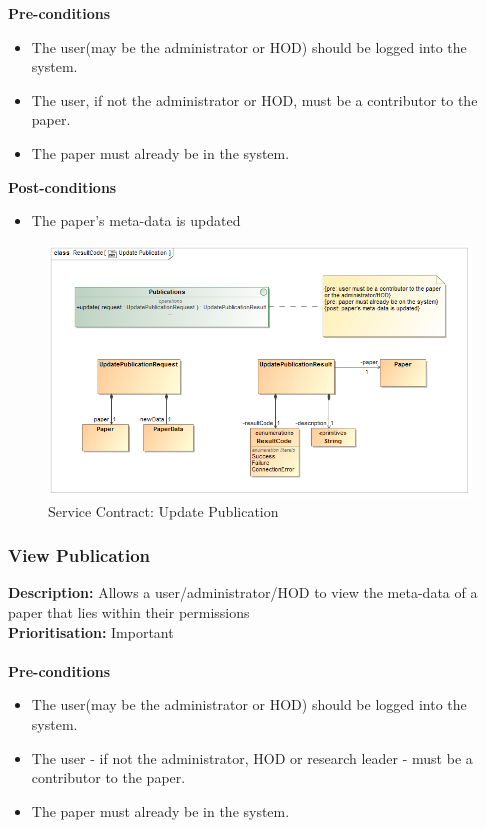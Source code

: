\documentclass[a4paper]{article}
\begin{document}
    \textbf{Pre-conditions}
     \begin{itemize}
        \item The user(may be the administrator or HOD) should be logged into the system.
        \item The user, if not the administrator or HOD, must be a contributor to the paper.
        \item The paper must already be in the system.
   \end{itemize}
    
    \textbf{Post-conditions}
    \begin{itemize}
        \item The paper's meta-data is updated
    \end{itemize}
    
        	\begin{figure}[H]
        		\centering
        		\includegraphics[width=\textwidth]{5.1.6.Update.Publication.Services.Contract.png}
        		\caption{Service Contract: Update Publication}
        	\end{figure}
    \pagebreak
    \subsubsection{View Publication}
    
    \textbf{Description:} Allows a user/administrator/HOD to view the meta-data of a paper that lies within their permissions\\
    \textbf{Prioritisation:} Important\\
    \\
    
    \textbf{Pre-conditions}
     \begin{itemize}
        \item The user(may be the administrator or HOD) should be logged into the system.
        \item The user - if not the administrator, HOD or research leader - must be a contributor to the paper.
        \item The paper must already be in the system.
   \end{itemize}
    
\end{document}
